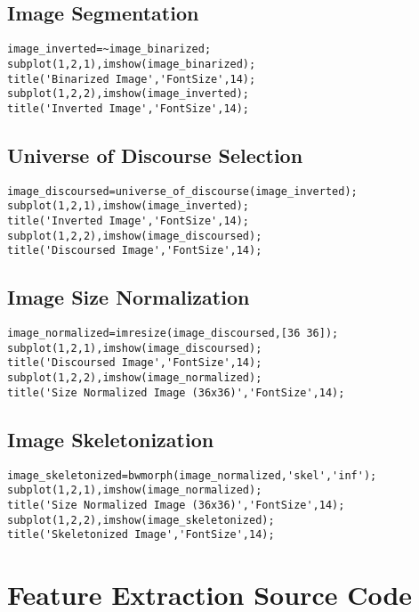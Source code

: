 \subsection*{Image Segmentation}
\begin{lstlisting}
image_inverted=~image_binarized;
subplot(1,2,1),imshow(image_binarized);
title('Binarized Image','FontSize',14);
subplot(1,2,2),imshow(image_inverted);
title('Inverted Image','FontSize',14);
\end{lstlisting}

\subsection*{Universe of Discourse Selection}
\begin{lstlisting}
image_discoursed=universe_of_discourse(image_inverted);
subplot(1,2,1),imshow(image_inverted);
title('Inverted Image','FontSize',14);
subplot(1,2,2),imshow(image_discoursed);
title('Discoursed Image','FontSize',14);
\end{lstlisting}

\subsection*{Image Size Normalization}
\begin{lstlisting}
image_normalized=imresize(image_discoursed,[36 36]);
subplot(1,2,1),imshow(image_discoursed);
title('Discoursed Image','FontSize',14);
subplot(1,2,2),imshow(image_normalized);
title('Size Normalized Image (36x36)','FontSize',14);
\end{lstlisting}

\subsection*{Image Skeletonization}
\begin{lstlisting}
image_skeletonized=bwmorph(image_normalized,'skel','inf');
subplot(1,2,1),imshow(image_normalized);
title('Size Normalized Image (36x36)','FontSize',14);
subplot(1,2,2),imshow(image_skeletonized);
title('Skeletonized Image','FontSize',14);
\end{lstlisting}

\section{Feature Extraction Source Code}
